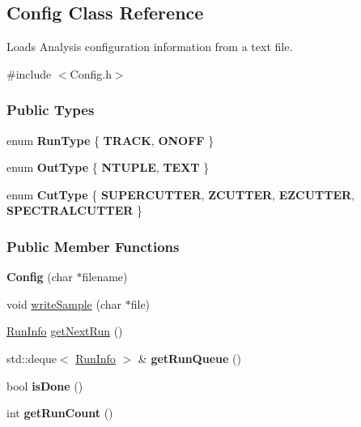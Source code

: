 \hypertarget{classConfig}{
\subsection{Config Class Reference}
\label{classConfig}
}


Loads Analysis configuration information from a text file.  




{\ttfamily \#include $<$Config.h$>$}

\subsubsection*{Public Types}
\begin{DoxyCompactItemize}
\item 
enum {\bfseries RunType} \{ {\bfseries TRACK}, 
{\bfseries ONOFF}
 \}
\item 
enum {\bfseries OutType} \{ {\bfseries NTUPLE}, 
{\bfseries TEXT}
 \}
\item 
enum {\bfseries CutType} \{ {\bfseries SUPERCUTTER}, 
{\bfseries ZCUTTER}, 
{\bfseries EZCUTTER}, 
{\bfseries SPECTRALCUTTER}
 \}
\end{DoxyCompactItemize}
\subsubsection*{Public Member Functions}
\begin{DoxyCompactItemize}
\item 
\hypertarget{classConfig_a7107b9451a2c5e2d68b31c27b6767529}{
{\bfseries Config} (char $\ast$filename)}
\label{classConfig_a7107b9451a2c5e2d68b31c27b6767529}

\item 
\hypertarget{classConfig_a41d36d315f24a126e7f0d0506bc001e6}{
void \hyperlink{classConfig_a41d36d315f24a126e7f0d0506bc001e6}{writeSample} (char $\ast$file)}
\label{classConfig_a41d36d315f24a126e7f0d0506bc001e6}

\item 
\hypertarget{classConfig_ab4adb3c03021c77c13b07864e0c643c2}{
\hyperlink{classRunInfo}{RunInfo} \hyperlink{classConfig_ab4adb3c03021c77c13b07864e0c643c2}{getNextRun} ()}
\label{classConfig_ab4adb3c03021c77c13b07864e0c643c2}

\item 
\hypertarget{classConfig_a93688b97b30ef4c399f979187e1db014}{
std::deque$<$ \hyperlink{classRunInfo}{RunInfo} $>$ \& {\bfseries getRunQueue} ()}
\label{classConfig_a93688b97b30ef4c399f979187e1db014}

\item 
\hypertarget{classConfig_a217ba471f05a4b279a699505cec8160f}{
bool {\bfseries isDone} ()}
\label{classConfig_a217ba471f05a4b279a699505cec8160f}

\item 
\hypertarget{classConfig_aa3db1fe06efca6585599321d61020fa3}{
int {\bfseries getRunCount} ()}
\label{classConfig_aa3db1fe06efca6585599321d61020fa3}

\end{DoxyCompactItemize}



